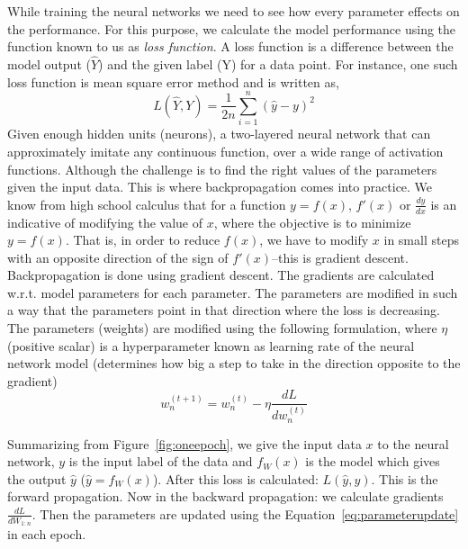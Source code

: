 While training the neural networks we need to see how every parameter effects on the performance. For this purpose, we calculate the model performance using the function known to us as \emph{loss function}. A loss function is a difference between the model output ($\hat{Y}$) and the given label (Y) for a data point. For instance, one such loss function is mean square error method and is written as, 
\begin{equation}
    L(\hat{Y},Y) = \frac{1}{2n}\sum_{i=1}^{n}(\hat{y}-y)^2
\end{equation}
Given enough hidden units (neurons), a two-layered neural network that can approximately imitate any continuous function, over a wide range of activation functions. Although the challenge is to find the right values of the parameters given the input data. This is where backpropagation comes into practice. 
We know from high school calculus that for a function $y = f(x)$, $f'(x)$ or $\frac{dy}{dx}$ is an indicative of modifying the value of $x$, where the objective is to minimize $y = f(x)$. That is, in order to reduce $f(x)$, we have to modify $x$ in small steps with an opposite direction of the sign of $f'(x)$--this is gradient descent. Backpropagation is done using gradient descent. The gradients are calculated w.r.t. model parameters for each parameter. The parameters are modified in such a way that the parameters point in that direction where the loss is decreasing. The parameters (weights) are modified using the following formulation, where $\eta$ (positive scalar) is a hyperparameter known as learning rate of the neural network model (determines how big a step to take in the direction opposite to the gradient)
\begin{equation}
    w_{n}^{(t+1)} = w_{n}^{(t)} - \eta\frac{dL}{dw_{n}^{(t)}}
    \label{eq:parameterupdate}
\end{equation}

Summarizing from Figure~\ref{fig:oneepoch}, we give the input data $x$ to the neural network, $y$ is the input label of the data and $f_W(x)$ is the model which gives the output $\hat{y}$ ($\hat{y} = f_W(x)$). After this loss is calculated: $L(\hat{y}, y)$. This is the forward propagation. 
Now in the backward  propagation: we calculate gradients $\frac{dL}{dW_{1:n}}$. Then the parameters are updated using the Equation~\ref{eq:parameterupdate} in each epoch. 

